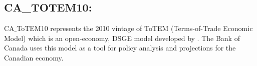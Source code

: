 \documentclass[11pt,a4paper]{article}
\begin{document}
	
	
	
	
	
	\subsection{CA\_TOTEM10: \texorpdfstring{\cite{murchison2006rennison}}{Murchinson and Rennison (2006)}}
	\label{CATOTEM10}
	CA$\_$ToTEM10 represents the 2010 vintage of ToTEM (Terms-of-Trade Economic Model) which is an open-economy, DSGE model developed by \cite{murchison2006rennison}. The Bank of Canada uses this model as a tool for policy analysis and projections for the Canadian economy.
	
\end{document}
